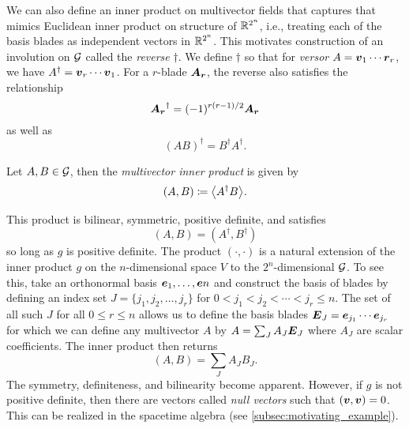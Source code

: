 We can also define an inner product on multivector fields that captures that mimics Euclidean inner product on structure of $\mathbb{R}^{2^n}$, i.e., treating each of the basis blades as independent vectors in $\mathbb{R}^{2^n}$. This motivates construction of an involution on $\mathcal{G}$ called the \emph{reverse} $\dagger$. We define $\dagger$ so that for \emph{versor} $A=\boldsymbol{v}_1 \cdots \boldsymbol{r}_r$, we have $A^\dagger = \boldsymbol{v}_r  \cdots \boldsymbol{v}_1$. For a $r$-blade $\boldsymbol{A_r}$, the reverse also satisfies the relationship
\begin{equation}
\label{eq:reverse_sign}
\boldsymbol{A_r}^\dagger = (-1)^{r(r-1)/2} \boldsymbol{A_r}
\end{equation}
as well as
\begin{equation}
\label{eq:dagger_distribution}
(AB)^\dagger = B^\dagger A^\dagger.
\end{equation}
\begin{definition}
Let $A,B \in \mathcal{G}$, then the \emph{multivector inner product} is given by
\begin{equation}
(A,B) \coloneqq \proj{}{A^\dagger B}.
\end{equation}
\end{definition}
This product is bilinear, symmetric, positive definite, and satisfies
\begin{equation}
(A,B)=(A^\dagger,B^\dagger)
\end{equation}
so long as $g$ is positive definite. The product $(\cdot,\cdot)$ is a natural extension of the inner product $g$ on the $n$-dimensional space $V$ to the $2^n$-dimensional $\mathcal{G}$. To see this, take an orthonormal basis $\boldsymbol{e}_1,\dots,\boldsymbol{e}n$ and construct the basis of blades by defining an index set $J=\{j_1,j_2,\dots,j_r\}$ for $0<j_1<j_2<\cdots< j_r\leq n$. The set of all such $J$ for all $0\leq r \leq n$ allows us to define the basis blades $\boldsymbol{E}_J = \boldsymbol{e}_{j_1}\cdots \boldsymbol{e}_{j_r}$ for which we can define any multivector $A$ by $A = \sum_J A_J \boldsymbol{E}_J$ where $A_J$ are scalar coefficients. The inner product then returns
\begin{equation}
(A,B) = \sum_{J} A_JB_J.
\end{equation}
The symmetry, definiteness, and bilinearity become apparent. However, if $g$ is not positive definite, then there are vectors called \emph{null vectors} such that $(\boldsymbol{v},\boldsymbol{v})=0$. This can be realized in the spacetime algebra (see \cref{subsec:motivating_example}).

